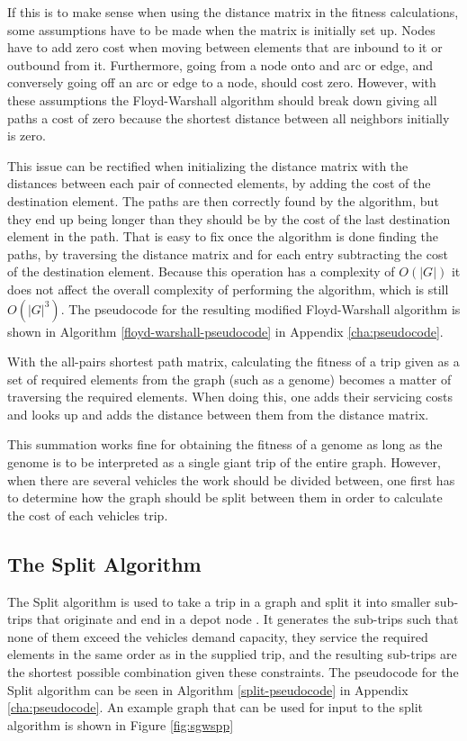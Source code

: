 If this is to make sense when using the distance matrix in the fitness calculations, some assumptions have to be made when the matrix is initially set up. Nodes have to add zero cost when moving between elements that are inbound to it or outbound from it. Furthermore, going from a node onto and arc or edge, and conversely going off an arc or edge to a node, should cost zero. However, with these assumptions the Floyd-Warshall algorithm should break down giving all paths a cost of zero because the shortest distance between all neighbors initially is zero.

This issue can be rectified when initializing the distance matrix with the distances between each pair of connected elements, by adding the cost of the destination element. The paths are then correctly found by the algorithm, but they end up being longer than they should be by the cost of the last destination element in the path. That is easy to fix once the algorithm is done finding the paths, by traversing the distance matrix and for each entry subtracting the cost of the destination element. Because this operation has a complexity of $O(|G|)$ it does not affect the overall complexity of performing the algorithm, which is still $O(|G|^3)$. The pseudocode for the resulting modified Floyd-Warshall algorithm is shown in Algorithm \ref{floyd-warshall-pseudocode} in Appendix \ref{cha:pseudocode}.

With the all-pairs shortest path matrix, calculating the fitness of a trip given as a set of required elements from the graph (such as a genome) becomes a matter of traversing the required elements. When doing this, one adds their servicing costs and looks up and adds the distance between them from the distance matrix.

This summation works fine for obtaining the fitness of a genome as long as the genome is to be interpreted as a single giant trip of the entire graph. However, when there are several vehicles the work should be divided between, one first has to determine how the graph should be split between them in order to calculate the cost of each vehicles trip.


\subsection{The Split Algorithm} %
\label{sub:the_split_algorithm}

The Split algorithm is used to take a trip in a graph and split it into smaller sub-trips that originate and end in a depot node \citep{ulusoy1985CARP}. It generates the sub-trips such that none of them exceed the vehicles demand capacity, they service the required elements in the same order as in the supplied trip, and the resulting sub-trips are the shortest possible combination given these constraints. The pseudocode for the Split algorithm can be seen in Algorithm \ref{split-pseudocode} in Appendix \ref{cha:pseudocode}. An example graph that can be used for input to the split algorithm is shown in Figure \ref{fig:sgwspp}

